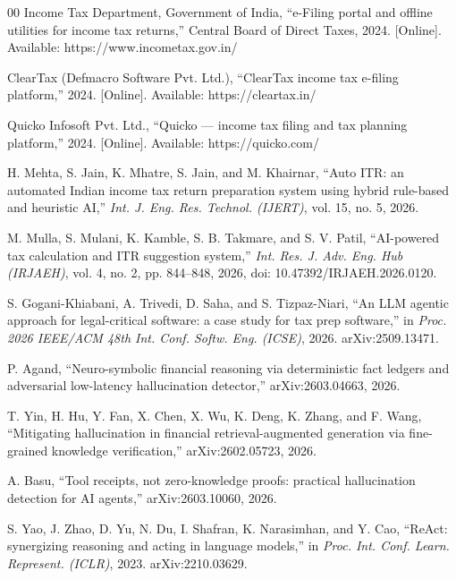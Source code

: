 \documentclass[conference]{IEEEtran}
\begin{document}
\begin{thebibliography}{00}
Income Tax Department, Government of India, ``e-Filing portal and offline
utilities for income tax returns,'' Central Board of Direct Taxes, 2024.
[Online]. Available: https://www.incometax.gov.in/

ClearTax (Defmacro Software Pvt. Ltd.), ``ClearTax income tax e-filing
platform,'' 2024. [Online]. Available: https://cleartax.in/

Quicko Infosoft Pvt. Ltd., ``Quicko --- income tax filing and tax planning
platform,'' 2024. [Online]. Available: https://quicko.com/

H. Mehta, S. Jain, K. Mhatre, S. Jain, and M. Khairnar, ``Auto ITR: an automated
Indian income tax return preparation system using hybrid rule-based and heuristic
AI,'' \emph{Int. J. Eng. Res. Technol. (IJERT)}, vol. 15, no. 5, 2026.

M. Mulla, S. Mulani, K. Kamble, S. B. Takmare, and S. V. Patil, ``AI-powered tax
calculation and ITR suggestion system,'' \emph{Int. Res. J. Adv. Eng. Hub
(IRJAEH)}, vol. 4, no. 2, pp. 844--848, 2026, doi: 10.47392/IRJAEH.2026.0120.

S. Gogani-Khiabani, A. Trivedi, D. Saha, and S. Tizpaz-Niari, ``An LLM agentic
approach for legal-critical software: a case study for tax prep software,'' in
\emph{Proc. 2026 IEEE/ACM 48th Int. Conf. Softw. Eng. (ICSE)}, 2026.
arXiv:2509.13471.

P. Agand, ``Neuro-symbolic financial reasoning via deterministic fact ledgers and
adversarial low-latency hallucination detector,'' arXiv:2603.04663, 2026.

T. Yin, H. Hu, Y. Fan, X. Chen, X. Wu, K. Deng, K. Zhang, and F. Wang,
``Mitigating hallucination in financial retrieval-augmented generation via
fine-grained knowledge verification,'' arXiv:2602.05723, 2026.

A. Basu, ``Tool receipts, not zero-knowledge proofs: practical hallucination
detection for AI agents,'' arXiv:2603.10060, 2026.

S. Yao, J. Zhao, D. Yu, N. Du, I. Shafran, K. Narasimhan, and Y. Cao, ``ReAct:
synergizing reasoning and acting in language models,'' in \emph{Proc. Int. Conf.
Learn. Represent. (ICLR)}, 2023. arXiv:2210.03629.


\end{thebibliography}
\end{document}
